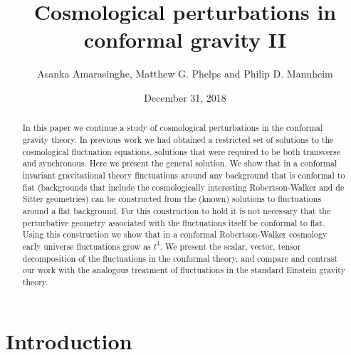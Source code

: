 \documentclass[aps]{revtex4}
\begin{document}
\allowdisplaybreaks
 
\title{Cosmological perturbations in conformal gravity II}

\author{Asanka Amarasinghe, Matthew G. Phelps and Philip D. Mannheim}

\date{December 31, 2018}

\begin{abstract}


In this paper we continue a study of cosmological perturbations in the conformal gravity theory. In previous work we had obtained a restricted set of solutions to the cosmological fluctuation equations, solutions that were required to be both transverse and synchronous. Here we present the general solution. We show that in a conformal invariant gravitational theory fluctuations around any background that is conformal to flat (backgrounds that include the cosmologically interesting Robertson-Walker and de Sitter geometries) can be constructed from the (known) solutions to fluctuations around a flat background. For this construction to hold it is not necessary that the perturbative geometry associated with the fluctuations itself be conformal to flat. Using this construction we show that in a conformal Robertson-Walker cosmology early universe fluctuations grow as $t^4$. We present the scalar, vector, tensor decomposition of the fluctuations in the conformal theory, and compare and contrast our work with the analogous treatment of fluctuations in the standard Einstein gravity theory.

\end{abstract}

\maketitle



\section{Introduction}
\label{S1}
\end{document}
